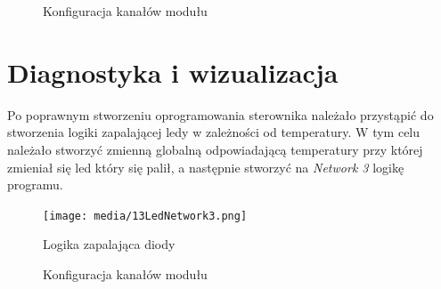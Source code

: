 \documentclass{article}
\begin{document}
\vspace{2em}

\begin{figure}[!ht]
    \centering
        \hfill
    \caption{Konfiguracja kanałów modułu}
    \label{fig:main2}
\end{figure}

\newpage
\section{Diagnostyka i wizualizacja}
Po poprawnym stworzeniu oprogramowania sterownika należało przystąpić do stworzenia logiki zapalającej ledy w zależności od temperatury. W tym celu należało stworzyć zmienną globalną odpowiadającą temperatury przy której zmieniał się led który się palił, a następnie stworzyć na \textit{Network 3} logikę programu.

\begin{figure}[H]
    \centering
    \texttt{[image: media/13LedNetwork3.png]}
    \caption{Logika zapalająca diody}
    \label{fig:ledy}    
\end{figure}



\begin{figure}[!ht]
    \centering
   
        \hfill
    \caption{Konfiguracja kanałów modułu}
    \label{fig:main3}
\end{figure}
\end{document}
